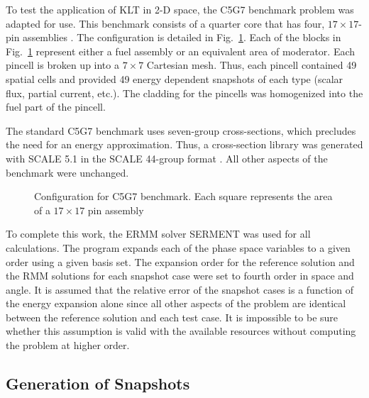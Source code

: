 \documentclass[5p,times,twocolumn,10pt]{elsarticle}
\newcommand{\FIG}[1]{Fig.~\ref{#1}}               %
\begin{document}
To test the application of KLT in 2-D space, the C5G7 benchmark problem was 
adapted for use.  This benchmark consists of a 
quarter core that has four, $17\times17$-pin 
assemblies \cite{C5G7}.  The configuration is detailed in  
\FIG{fig:C5G7_config}.  Each of the blocks in \FIG{fig:C5G7_config} 
represent either a fuel assembly or an equivalent area of 
moderator.  Each pincell is broken up into a $7\times7$ 
Cartesian mesh. Thus, each pincell contained 49 spatial cells and provided 49 
energy dependent snapshots of each type (scalar flux, partial current, etc.).  
The cladding for the pincells was 
homogenized into the fuel part of the pincell.  

The standard C5G7 benchmark uses seven-group cross-sections, which precludes 
the need for an energy approximation.  Thus, a cross-section library was 
generated with SCALE 5.1 in the SCALE 44-group format \cite{Scale}.  All other 
aspects of the benchmark were unchanged.

\begin{figure}[htb]
    \centering
    
    \caption{Configuration for C5G7 benchmark.  Each square represents the area 
of a 
             $17\times17$ pin assembly}
    \label{fig:C5G7_config}
\end{figure}

To complete this work, the ERMM solver SERMENT \cite{RobertsSerment} was used
for all calculations.  The program expands each of the phase space variables
to a given order using a given basis set.  The expansion order for the reference solution and the RMM
solutions for each 
snapshot case were set to fourth order in space and angle. It is assumed that the relative 
error of the snapshot cases is a function of the energy expansion alone since 
all other aspects of the problem are identical between the reference solution 
and each test case.  It is impossible to be sure whether this assumption is valid 
with the available resources without computing the problem at higher order.
\subsection{Generation of Snapshots}
\end{document}
